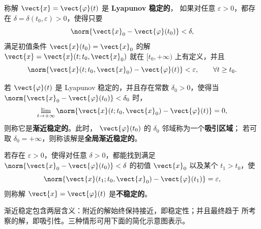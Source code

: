 \begin{definition}\label{def:Lyapunov稳定性}
	称解 $\vect{x}=\vect{\varphi}(t)$ 是 \textbf{Lyapunov 稳定的}，
	如果对任意 $\varepsilon>0$，都存在
	$\delta=\delta(t_0,\varepsilon)>0$，使得只要
	\[
		\norm{\vect{x}_0-\vect{\varphi}(t_0)}<\delta,
	\]
	满足初值条件 $\vect{x}(t_0)=\vect{x}_0$ 的解
	$\vect{x}=\vect{x}(t;t_0,\vect{x}_0)$ 就在
	$[t_0,+\infty)$ 上有定义，并且
	\[
		\norm{
		\vect{x}(t;t_0,\vect{x}_0)-\vect{\varphi}(t)
		}<\varepsilon,
		\qquad \forall t\geq t_0.
	\]

	若 $\vect{\varphi}(t)$ 是 Lyapunov 稳定的，并且存在常数
	$\delta_0>0$，使得当
	$\norm{\vect{x}_0-\vect{\varphi}(t_0)}<\delta_0$ 时，
	\[
		\lim_{t\to+\infty}
		\norm{
		\vect{x}(t;t_0,\vect{x}_0)-\vect{\varphi}(t)
		}=0,
	\]
	则称它是\textbf{渐近稳定的}。此时，
	$\vect{\varphi}(t_0)$ 的 $\delta_0$ 邻域称为一个\textbf{吸引区域}；
	若可取 $\delta_0=+\infty$，则称该解是\textbf{全局渐近稳定的}。

	若存在 $\varepsilon>0$，使得对任意 $\delta>0$，都能找到满足
	$\norm{\vect{x}_0-\vect{\varphi}(t_0)}<\delta$ 的初值
	$\vect{x}_0$ 以及某个 $t_1>t_0$，使
	\[
		\norm{
		\vect{x}(t_1;t_0,\vect{x}_0)-\vect{\varphi}(t_1)
		}=\varepsilon,
	\]
	则称解 $\vect{x}=\vect{\varphi}(t)$ 是\textbf{不稳定的}。
\end{definition}

渐近稳定包含两层含义：附近的解始终保持接近，即稳定性；并且最终趋于
所考察的解，即吸引性。三种情形可用下面的简化示意图表示。

